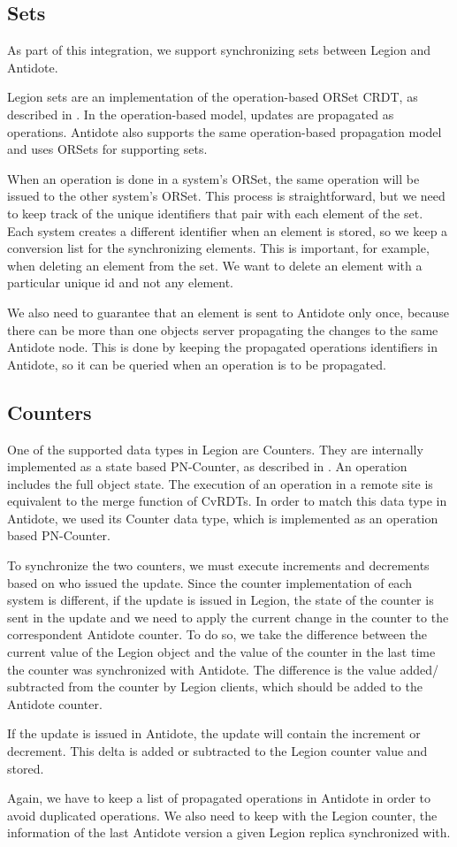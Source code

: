 \subsection{Sets}
\label{sec:sets}
As part of this integration, we support synchronizing sets between Legion and Antidote.\par Legion sets are an implementation of the operation-based ORSet CRDT, as described in \cite{crdt}. In the operation-based model, updates are propagated as operations. Antidote also supports the same operation-based propagation model and uses ORSets for supporting sets.\par
	When an operation is done in a system's ORSet, the same operation will be issued to the other system's ORSet. This process is straightforward, but we need to keep track of the unique identifiers that pair with each element of the set. Each system creates a different identifier when an element is stored, so we keep a conversion list for the synchronizing elements. This is important, for example, when deleting an element from the set. We want to delete an element with a particular unique id and not any element.\par
	We also need to guarantee that an element is sent to Antidote only once, because there can be more than one objects server propagating the changes to the same Antidote node. This is done by keeping the propagated operations identifiers in Antidote, so it can be queried when an operation is to be propagated.

\subsection{Counters}
\label{sec:counters}
One of the supported data types in Legion are Counters. They are internally implemented as a state based PN-Counter, as described in \cite{crdt}. An operation includes the full object state. The execution of an operation in a remote site is equivalent to the merge function of CvRDTs. In order to match this data type in Antidote, we used its Counter data type, which is implemented as an operation based PN-Counter.\par
	To synchronize the two counters, we must execute increments and decrements based on who issued the update. Since the counter implementation of each system is different, if the update is issued in Legion, the state of the counter is sent in the update and we need to apply the current change in the counter to the correspondent Antidote counter. To do so, we take the difference between the current value of the Legion object and the value of the counter in the last time the counter was synchronized with Antidote. The difference is the value added/ subtracted from the counter by Legion clients, which should be added to the Antidote counter.\par
	If the update is issued in Antidote, the update will contain the increment or decrement. This delta is added or subtracted to the Legion counter value and stored.\par
	Again, we have to keep a list of propagated operations in Antidote in order to avoid duplicated operations. We also need to keep with the Legion counter, the information of the last Antidote version a given Legion replica synchronized with.

